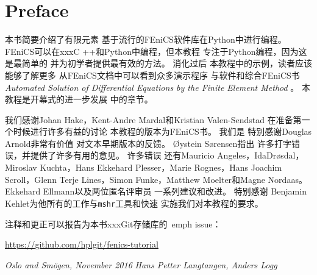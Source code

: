 \chapter*{Preface}

本书简要介绍了有限元素
基于流行的FEniCS软件库在Python中进行编程。
FEniCS可以在xxxC ++和Python中编程，但本教程
专注于Python编程，因为这是最简单的
并为初学者提供最有效的方法。 消化过后
本教程中的示例，读者应该能够了解更多
从FEniCS文档中可以看到众多演示程序
与软件和综合FEniCS书 \emph{Automated
Solution of Differential Equations by the Finite Element Method}
\cite{FEniCS}。 本教程是开幕式的进一步发展
\cite{FEniCS}中的章节。

我们感谢Johan Hake，Kent-Andre Mardal和Kristian Valen-Sendstad
在准备第一个时候进行许多有益的讨论
本教程的版本为FEniCS书\cite{FEniCS}。 我们是
特别感谢Douglas Arnold非常有价值
对文本早期版本的反馈。 Øystein Sørensen指出
许多打字错误，并提供了许多有用的意见。 许多错误
还有Mauricio Angeles，IdaDrøsdal，
Miroslav Kuchta，Hans Ekkehard Plesser，Marie Rognes，Hans Joachim
Scroll，Glenn Terje Lines，Simon Funke，Matthew Moelter和Magne
Nordaas。 Ekkehard Ellmann以及两位匿名评审员
一系列建议和改进。 特别感谢
Benjamin Kehlet为他所有的工作与\texttt{mshr}工具和快速
实施我们对本教程的要求。

注释和更正可以报告为本书xxxGit存储库的\ emph {issue}：
\begin{center}
\url{https://github.com/hplgit/fenics-tutorial}
\end{center}

\vspace{1cm}

\noindent
{\it Oslo and Smögen, November 2016} \hfill  {\it Hans Petter Langtangen, Anders Logg}
